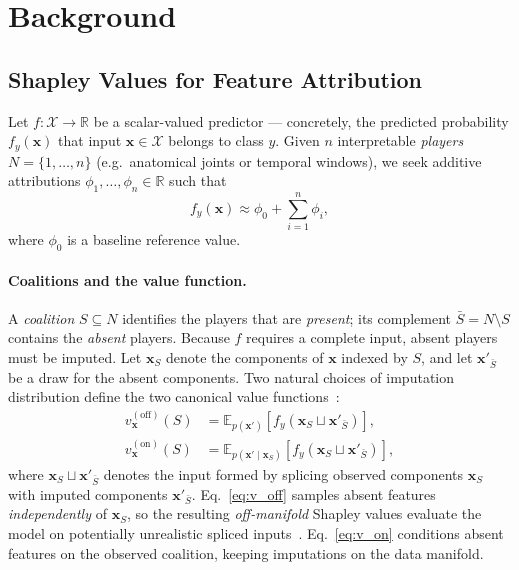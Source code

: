 \section{Background}
\label{sec:background}

\subsection{Shapley Values for Feature Attribution}

Let $f : \mathcal{X} \to \mathbb{R}$ be a scalar-valued predictor — concretely,
the predicted probability $f_y(\mathbf{x})$ that input $\mathbf{x} \in \mathcal{X}$
belongs to class $y$.  Given $n$ interpretable \emph{players}
$N = \{1, \ldots, n\}$ (e.g.\ anatomical joints or temporal windows), we seek
additive attributions $\phi_1, \ldots, \phi_n \in \mathbb{R}$ such that
\begin{equation}
  f_y(\mathbf{x}) \approx \phi_0 + \sum_{i=1}^{n} \phi_i,
  \label{eq:additive}
\end{equation}
where $\phi_0$ is a baseline reference value.

\paragraph{Coalitions and the value function.}
A \emph{coalition} $S \subseteq N$ identifies the players that are
\emph{present}; its complement $\bar{S} = N \setminus S$ contains the
\emph{absent} players.  Because $f$ requires a complete input, absent players
must be imputed.  Let $\mathbf{x}_S$ denote the components of $\mathbf{x}$
indexed by $S$, and let $\mathbf{x}'_{\bar{S}}$ be a draw for the absent
components.  Two natural choices of imputation distribution define the two
canonical value functions~\citep{frye2021shapley}:
\begin{align}
  v^{(\mathrm{off})}_\mathbf{x}(S)
    &= \mathbb{E}_{p(\mathbf{x}')}\!\left[
        f_y\!\left(\mathbf{x}_S \sqcup \mathbf{x}'_{\bar{S}}\right)
      \right],
  \label{eq:v_off} \\
  v^{(\mathrm{on})}_\mathbf{x}(S)
    &= \mathbb{E}_{p(\mathbf{x}' \mid \mathbf{x}_S)}\!\left[
        f_y\!\left(\mathbf{x}_S \sqcup \mathbf{x}'_{\bar{S}}\right)
      \right],
  \label{eq:v_on}
\end{align}
where $\mathbf{x}_S \sqcup \mathbf{x}'_{\bar{S}}$ denotes the input formed by
splicing observed components $\mathbf{x}_S$ with imputed components
$\mathbf{x}'_{\bar{S}}$.  Eq.~\eqref{eq:v_off} samples absent features
\emph{independently} of $\mathbf{x}_S$, so the resulting \emph{off-manifold}
Shapley values evaluate the model on potentially unrealistic spliced
inputs~\citep{frye2021shapley}.  Eq.~\eqref{eq:v_on} conditions absent features
on the observed coalition, keeping imputations on the data manifold.

